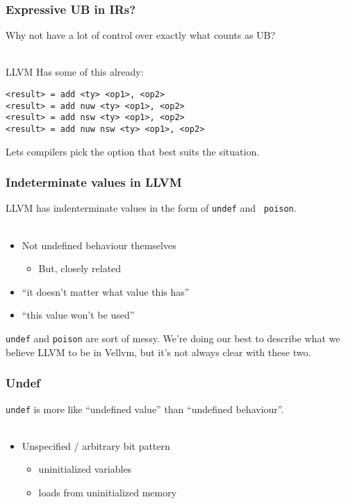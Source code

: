 \documentclass{beamer}
\begin{document}
\begin{frame}[fragile]
  \frametitle{Expressive UB in IRs?}

  Why not have a lot of control over exactly what counts as UB?\\~

  \pause

  LLVM Has some of this already:

\begin{verbatim}
<result> = add <ty> <op1>, <op2>
<result> = add nuw <ty> <op1>, <op2>
<result> = add nsw <ty> <op1>, <op2>
<result> = add nuw nsw <ty> <op1>, <op2>
\end{verbatim}

  Lets compilers pick the option that best suits the situation.
\end{frame}

\begin{frame}
  \frametitle{Indeterminate values in LLVM}

  LLVM has indenterminate values in the form of {\tt undef} and {\tt
    poison}.\\~

  \begin{itemize}
  \item Not undefined behaviour themselves
    \begin{itemize}
    \item But, closely related
    \end{itemize}
  \item ``it doesn't matter what value this has''
  \item ``this value won't be used''
  \end{itemize}

  \pause

  {\tt undef} and {\tt poison} are sort of messy. We're doing our best
  to describe what we believe LLVM to be in Vellvm, but it's not
  always clear with these two.

\end{frame}

\begin{frame}
  \frametitle{Undef}

  {\tt undef} is more like ``undefined value'' than ``undefined
  behaviour''.\\~

  \begin{itemize}
  \item Unspecified / arbitrary bit pattern
    \begin{itemize}
    \item uninitialized variables
    \item loads from uninitialized memory
    \end{itemize}
  \end{itemize}
\end{frame}
\end{document}
